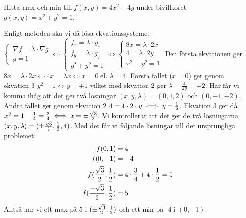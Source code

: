 \documentclass[a4paper]{article}
\begin{document}
\begin{ex}
    Hitta max och min till \(
        f(x,y) = 4x^2+4y
    \) under bivillkoret \(
        g(x,y) = x^2+y^2 = 1
    \).

    Enligt metoden ska vi då lösa ekvationssystemet 
    \(
        \left\{\begin{matrix}
            \nabla f = \lambda \cdot \nabla g\\ 
            g = 1
        \end{matrix}\right. 
        \iff 
        \left\{\begin{matrix}
            f_x = \lambda \cdot g_x \\
            f_y = \lambda \cdot g_y \\ 
            g^2+y^2 = 1
        \end{matrix}\right.
        \iff 
        \left\{\begin{matrix}
            8x = \lambda \cdot 2x \\
            4 = \lambda \cdot 2y \\
            x^2+y^2 = 1
        \end{matrix}\right.
    \) Den första ekvationen ger \(
        8x = \lambda \cdot 2x \iff 4x = \lambda x \iff x = 0 \text{ el. } \lambda = 4 
    \). Första fallet (\(
        x=0
    \)) ger genom ekvation 3 \(
        y^2 = 1 \iff y = \pm 1
    \) vilket med ekvation 2 ger \(
        \lambda = \frac{4}{2y} = \pm 2
    \). Här får vi komma ihåg att det ger två lösningar \(
        (x,y,\lambda) = (0,1,2) \text{ och } (0,-1,-2)
    \). Andra fallet ger genom ekvation 2 \(
        4 = 4 \cdot 2 \cdot y \iff y = \frac{1}{2}
    \). Ekvation 3 ger då \(
        x^2 = 1 - \frac{1}{4} =\frac{3}{4} \iff x = \pm \frac{\sqrt{3}}{2}
    \). Vi kontrollerar att det ger de två lösningarna \(
        (x,y,\lambda) = (\pm \frac{\sqrt{3}}{2}, \frac{1}{2}, 4) 
    \). Med det får vi följande lösningar till det ursprungliga problemet:
    \begin{align*}
        f(0,1) &= 4 \\
        f(0,-1) &= -4 \\
        f(\frac{\sqrt{3}}{2}, \frac{1}{2}) &= 4 \cdot \frac{3}{4} + 4 \cdot \frac{1}{2} = 5 \\
        f(\frac{-\sqrt{3}}{2}, \frac{1}{2}) &= 5 
    \end{align*}
    Alltså har vi ett max på \(
        5
    \) i \(
        (\pm\frac{\sqrt{3}}{2}, \frac{1}{2})
    \) och ett min på -4 i \(
        (0, -1)
    \).
\end{ex}
\end{document}

